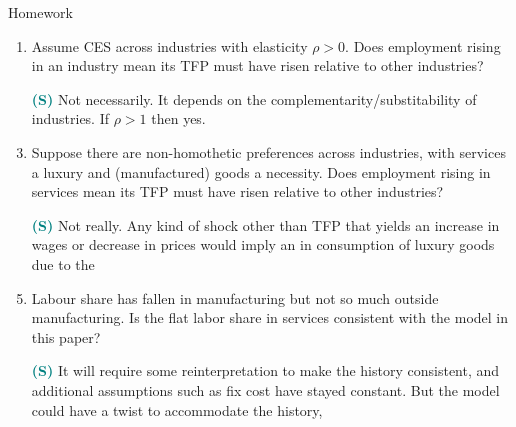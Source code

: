 \documentclass[usenames,dvipsnames,aspectratio=169]{beamer}
\begin{document}
\begin{frame}[allowframebreaks]{Homework}
\begin{enumerate}[label=\textbf{\textcolor{teal}{(\arabic*)}},leftmargin=*]
    \item Assume CES across industries with elasticity $\rho>0$. Does employment rising in an industry mean its TFP must have risen relative to other industries?
    \item[\textbf{\textcolor{teal}{(S)}}] Not necessarily. It depends on the complementarity/substitability of industries. If $\rho>1$ then yes.  
    \item Suppose there are non-homothetic preferences across industries, with services a luxury and (manufactured) goods a necessity. Does employment rising in services mean its TFP must have risen relative to other industries?
    \item[\textbf{\textcolor{teal}{(S)}}] Not really. Any kind of shock other than TFP that yields an increase in wages or decrease in prices would imply an in consumption of luxury goods due to the 
    \item Labour share has fallen in manufacturing but not so much outside manufacturing. Is the flat labor share in services consistent with the model in this paper?
    \item[\textbf{\textcolor{teal}{(S)}}] It will require some reinterpretation to make the history consistent, and additional assumptions such as fix cost have stayed constant. But the model could have a twist to accommodate the history,  
\end{enumerate}

\end{frame}
\end{document}
